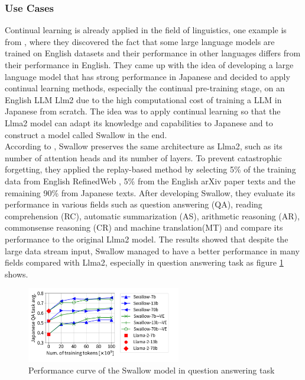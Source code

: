 \documentclass[runningheads]{llncs}
\begin{document}
\subsubsection{Use Cases}
\noindent \newline
Continual learning is already applied in the field of linguistics, one example is from \cite{Fujii24}, where they discovered the fact that some large language models are trained on English datasets and their performance 
in other languages differs from their performance in English. They came up with the idea of developing a large language model that has strong performance in Japanese and decided to apply continual learning methods, especially 
the continual pre-training stage, on an English LLM Llm2 due to the high computational cost of training a LLM in Japanese from scratch. The idea was to apply continual learning so that the Llma2 model can adapt its knowledge 
and capabilities to Japanese and to construct a model called Swallow in the end. \\
\noindent \newline
According to \cite{Fujii24}, Swallow preserves the same architecture as Llma2, such as its number of attention heads and its number of layers. To prevent catastrophic forgetting, they applied the replay-based method
by selecting 5\% of the training data from English RefinedWeb \cite{Penedo23}, 5\% from the English arXiv paper texts and the remaining 90\% from Japanese texts. After developing Swallow, they evaluate its performance in various fields such
as question answering (QA), reading comprehension (RC), automatic summarization (AS), arithmetic reasoning (AR), commonsense reasoning (CR) and machine translation(MT) and compare its performance to the original Llma2 model.
The results showed that despite the large data stream input, Swallow managed to have a better performance in many fields compared with Llma2, especially in question answering task as figure \ref{fig:swallow} shows.
\begin{figure}[htbp]
  \centering
  \includegraphics[width=0.6\textwidth]{swallow.png}
  \caption{Performance curve of the Swallow model in question answering task \cite{Fujii24}}
  \label{fig:swallow}
\end{figure}
\end{document}
